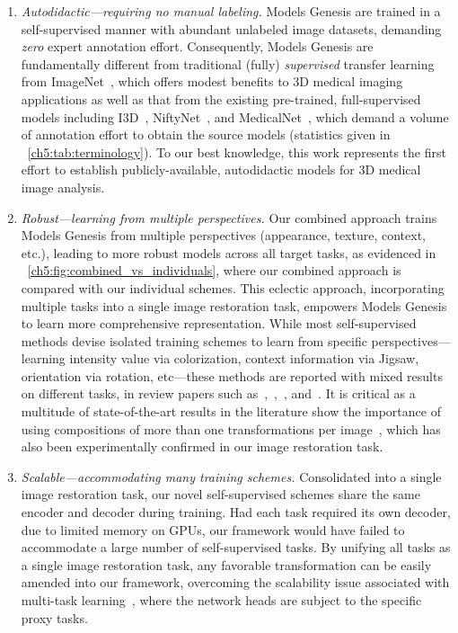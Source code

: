 \begin{enumerate}
    \item \textit{Autodidactic---requiring no manual labeling.} Models Genesis are trained in a self-supervised manner with abundant unlabeled image datasets, demanding {\em zero} expert annotation effort. Consequently, Models Genesis are fundamentally different from traditional (fully) {\em supervised} transfer learning from ImageNet~\citep{bar2015chest,shin2016deep,tajbakhsh2016convolutional}, which offers modest benefits to 3D medical imaging applications as well as that from the existing pre-trained, full-supervised models including I3D~\citep{carreira2017quo}, NiftyNet~\citep{gibson2018niftynet}, and MedicalNet~\citep{chen2019med3d}, which demand a volume of annotation effort to obtain the source models (statistics given in \tablename~\ref{ch5:tab:terminology}). To our best knowledge, this work represents the first effort to establish publicly-available, autodidactic models for 3D medical image analysis.
    
    \item \textit{Robust---learning from multiple perspectives.} Our combined approach trains Models Genesis from multiple perspectives (appearance, texture, context, etc.), leading to more robust models across all target tasks, as evidenced in \figureautorefname~\ref{ch5:fig:combined_vs_individuals}, where our combined approach is compared with our individual schemes. This eclectic approach, incorporating multiple tasks into a single image restoration task, empowers Models Genesis to learn more comprehensive representation. While most self-supervised methods devise isolated training schemes to learn from specific perspectives---learning intensity value via colorization, context information via Jigsaw, orientation via rotation, etc---these methods are reported with mixed results on different tasks, in review papers such as~\citet{goyal2019scaling},~\citet{kolesnikov2019revisiting},~\citet{taleb20203d}, and~\citet{jing2020self}. It is critical as a multitude of state-of-the-art results in the literature show the importance of using compositions of more than one transformations per image~\citep{graham2014fractional,dosovitskiy2015discriminative,wu2020generalization}, which has also been experimentally confirmed in our image restoration task.
    
    \item \textit{Scalable---accommodating many training schemes.} Consolidated into a single image restoration task, our novel self-supervised schemes share the same encoder and decoder during training. Had each task required its own decoder, due to limited memory on GPUs, our framework would have failed to accommodate a large number of self-supervised tasks. By unifying all tasks as a single image restoration task, any favorable transformation can be easily amended into our framework, overcoming the scalability issue associated with multi-task learning~\citep{doersch2017multi,noroozi2018boosting,standley2020tasks,chen2019med3d}, where the network heads are subject to the specific proxy tasks.
    

\end{enumerate}

